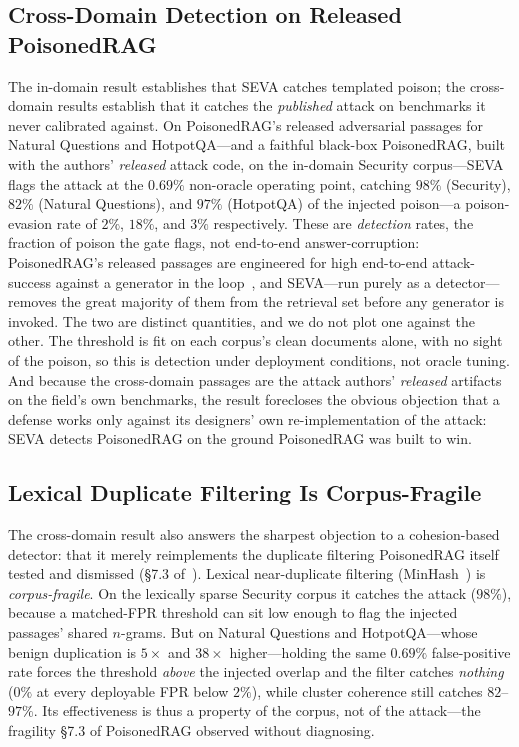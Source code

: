 \documentclass[10pt,journal,compsoc]{IEEEtran}
\begin{document}
\subsection{Cross-Domain Detection on Released PoisonedRAG}
The in-domain result establishes that SEVA catches templated poison; the
cross-domain results establish that it catches the \emph{published} attack on
benchmarks it never calibrated against. On PoisonedRAG's released adversarial
passages for Natural Questions and HotpotQA---and a faithful black-box PoisonedRAG,
built with the authors' \emph{released} attack code, on the in-domain Security
corpus---SEVA flags
the attack at the $0.69\%$ non-oracle operating point, catching $98\%$ (Security),
$82\%$ (Natural Questions), and $97\%$ (HotpotQA) of the injected poison---a poison-evasion rate of $2\%$, $18\%$, and $3\%$
respectively. These are \emph{detection} rates, the fraction of poison the gate
flags, not end-to-end answer-corruption: PoisonedRAG's released passages are
engineered for high end-to-end attack-success against a generator in the
loop~\cite{poisonedrag}, and SEVA---run purely as a detector---removes the great
majority of them from the retrieval set before any generator is invoked. The two are
distinct quantities, and we do not plot one against the other.
The threshold is fit on each corpus's clean documents alone, with no sight of the
poison, so this is detection under deployment conditions, not oracle tuning. And
because the cross-domain passages are the attack authors' \emph{released} artifacts
on the field's own benchmarks, the result forecloses the obvious objection that a
defense works only
against its designers' own re-implementation of the attack: SEVA detects
PoisonedRAG on the ground PoisonedRAG was built to win.

\subsection{Lexical Duplicate Filtering Is Corpus-Fragile}
\label{subsec:lex}
The cross-domain result also answers the sharpest objection to a cohesion-based detector: that
it merely reimplements the duplicate filtering PoisonedRAG itself tested and dismissed
(\S7.3 of~\cite{poisonedrag}). Lexical near-duplicate filtering (MinHash~\cite{minhash}) is \emph{corpus-fragile}. On the lexically
sparse Security corpus it catches the attack ($98\%$), because a matched-FPR threshold can sit
low enough to flag the injected passages' shared $n$-grams. But on Natural Questions and
HotpotQA---whose benign duplication is $5\times$ and $38\times$ higher---holding the same
$0.69\%$ false-positive rate forces the threshold \emph{above} the injected overlap and the
filter catches \emph{nothing} ($0\%$ at every deployable FPR below $2\%$), while cluster
coherence still catches $82$--$97\%$. Its effectiveness is thus a property of the corpus, not of
the attack---the fragility \S7.3 of PoisonedRAG observed without diagnosing.
\end{document}
